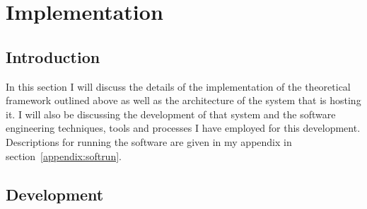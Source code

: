 \documentclass[]{final_report}
\begin{document}
\section{Implementation}
\subsection{Introduction}
In this section I will discuss the details of the implementation of the theoretical framework outlined above as well as the architecture of the system that is hosting it. I will also be discussing the development of that system and the software engineering techniques, tools and processes I have employed for this development. Descriptions for running the software are given in my appendix in section~\ref{appendix:softrun}.

\subsection{Development}
\end{document}
